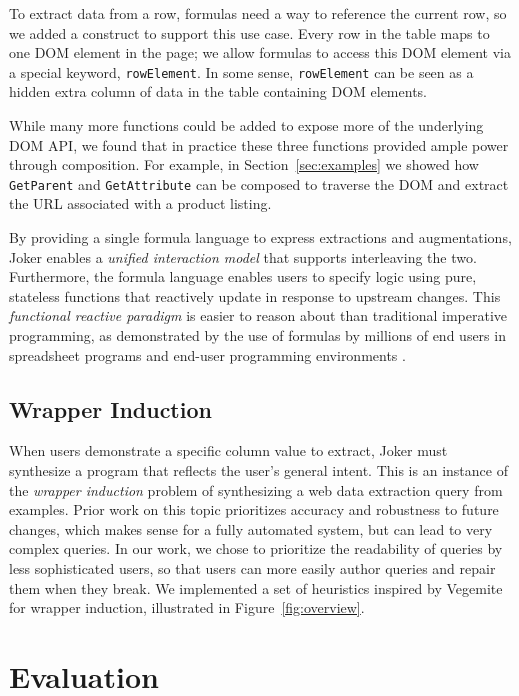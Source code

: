 \documentclass[sigconf,10pt]{acmart}
\begin{document}
To extract data from a row, formulas need a way to reference the current
row, so we added a construct to support this use case. Every row in the
table maps to one DOM element in the page; we allow formulas to access
this DOM element via a special keyword, \texttt{rowElement}. In some
sense, \texttt{rowElement} can be seen as a hidden extra column of data
in the table containing DOM elements.

While many more functions could be added to expose more of the
underlying DOM API, we found that in practice these three functions
provided ample power through composition. For example, in
Section~\ref{sec:examples} we showed how \texttt{GetParent} and
\texttt{GetAttribute} can be composed to traverse the DOM and extract
the URL associated with a product listing.

By providing a single formula language to express extractions and
augmentations, Joker enables a \emph{unified interaction model} that
supports interleaving the two. Furthermore, the formula language enables
users to specify logic using pure, stateless functions that reactively
update in response to upstream changes. This \emph{functional reactive
paradigm} is easier to reason about than traditional imperative
programming, as demonstrated by the use of formulas by millions of end
users in spreadsheet programs and end-user programming environments
\citep{2021g, 2021h, 2021f, 2021a, 2021c, chang2014}.

\hypertarget{wrapper-induction}{%
\subsection{Wrapper Induction}\label{wrapper-induction}}

When users demonstrate a specific column value to extract, Joker must
synthesize a program that reflects the user's general intent. This is an
instance of the \emph{wrapper induction} problem of synthesizing a web
data extraction query from examples. Prior work on this topic
\citep{kushmerick2000, furche2016} prioritizes accuracy and robustness
to future changes, which makes sense for a fully automated system, but
can lead to very complex queries. In our work, we chose to prioritize
the readability of queries by less sophisticated users, so that users
can more easily author queries and repair them when they break. We
implemented a set of heuristics inspired by Vegemite \citep{lin2009} for
wrapper induction, illustrated in Figure~\ref{fig:overview}.

\hypertarget{sec:evaluation}{%
\section{Evaluation}\label{sec:evaluation}}
\end{document}
